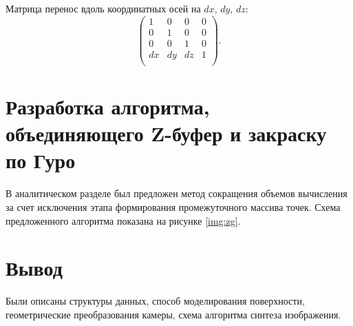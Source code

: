 Матрица перенос вдоль координатных осей на $dx$, $dy$, $dz$:
\begin{equation}
	\begin{pmatrix}
		1 & 0 & 0 & 0 \\
		0 & 1 & 0 & 0 \\
		0 & 0 & 1 & 0 \\
		dx & dy & dz & 1 \\
	\end{pmatrix}.
\end{equation}

\section{Разработка алгоритма, объединяющего Z-буфер и закраску по Гуро}

В аналитическом разделе был предложен метод сокращения объемов вычисления за счет исключения этапа формирования промежуточного массива точек.
Схема предложенного алгоритма показана на рисунке \ref{img:zg}.


\section*{Вывод}

Были описаны структуры данных, способ моделирования поверхности, геометрические преобразования камеры, схема алгоритма синтеза изображения.
